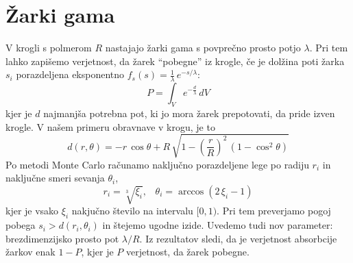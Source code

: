 \newpage
\section[]{Žarki gama}

V krogli s polmerom $R$ nastajajo žarki gama s povprečno prosto potjo $\lambda$. Pri tem lahko zapišemo verjetnost, da žarek ``pobegne'' iz krogle, če je dolžina poti žarka $s_i$ porazdeljena eksponentno $f_s(s)=\frac{1}{\lambda}\,e^{-s/\lambda}$:
\begin{equation}
    P=\int_{V} e^{-\frac{d}{\lambda}}\,dV
\end{equation}
kjer je $d$ najmanjša potrebna pot, ki jo mora žarek prepotovati, da pride izven krogle. V našem primeru obravnave v krogu, je to
\begin{equation}
    d(r,\theta) = -r\,\cos\theta + R\,\sqrt{1-\left(\frac{r}{R}\right)^2\,(1-\cos^2\theta)}
\end{equation}
Po metodi Monte Carlo računamo naključno porazdeljene lege po radiju $r_i$ in naključne smeri sevanja $\theta_i$,
\begin{equation}
    r_i = \sqrt[3]{\xi_i}\text{,} \quad \theta_i = \arccos(2\,\xi_i-1)
\end{equation}
kjer je vsako $\xi_i$ nakjučno število na intervalu $[0,1)$. Pri tem preverjamo pogoj pobega $s_i > d(r_i,\theta_i)$ in štejemo ugodne izide. Uvedemo tudi nov parameter: brezdimenzijsko prosto pot $\lambda/R$. Iz rezultatov sledi, da je verjetnost absorbcije žarkov enak $1-P$, kjer je $P$ verjetnost, da žarek pobegne.

